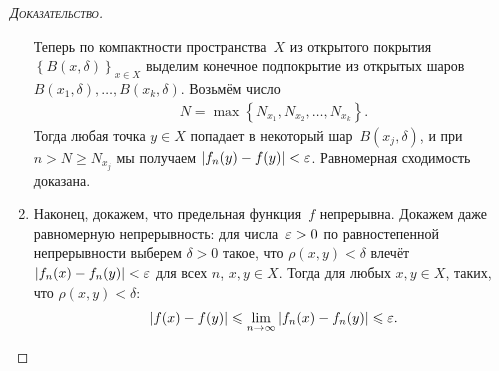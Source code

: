 \documentclass[../complex-analysis.tex]{subfiles}
\begin{document}
\begin{proof}[\normalfont\textsc{Доказательство}]
\begin{enumerate}
   Теперь по компактности пространства~$ X $ из открытого покрытия $ \left\{B(x,\delta)\right\}_{x \in X} $   выделим конечное подпокрытие из открытых шаров $ B(x_1,\delta), \ldots, B(x_k, \delta) $. Возьмём число
   \begin{align*}
    N = \max \left\{ N_{x_1}, N_{x_2}, \ldots, N_{x_k} \right\}.
   \end{align*} Тогда любая точка $ y \in X $ попадает в некоторый шар~$ B(x_j,\delta) $, и при $ n > N \geqslant N_{x_j} $ мы получаем $ \left| f_n(y) - f(y) \right| < \varepsilon $. Равномерная сходимость доказана.

  \item Наконец, докажем, что предельная функция~$ f $ непрерывна. Докажем даже равномерную непрерывность: для числа~$ \varepsilon > 0 $ по равностепенной непрерывности выберем $ \delta > 0 $ такое, что $ \rho(x,y) < \delta $ влечёт $ \left| f_n(x)-f_n(y) \right| < \varepsilon $ для всех $ n $, $ x,y\in X $. Тогда для любых $ x,y \in X $, таких, что $ \rho(x,y) < \delta $:
   \begin{align*}
    \left| f(x)-f(y) \right| \leqslant \lim_{n \to \infty} \left| f_n(x) - f_n(y) \right| \leqslant \varepsilon.
   \end{align*}
 \end{enumerate}
\end{proof}
\end{document}

